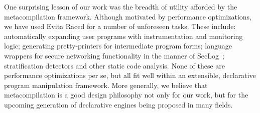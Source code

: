 One surprising lesson of our work was the breadth of utility afforded by the
metacompilation framework.  Although motivated by performance optimizations, we
have used Evita Raced for a number of unforeseen tasks.  These include:
automatically expanding user programs with instrumentation and monitoring
logic; generating pretty-printers for intermediate program forms; language
wrappers for secure networking functionality in the manner of
SecLog~\cite{abadi-netdb07}; stratification detectors and other static code
analysis.  None of these are performance optimizations per se, but all fit well
within an extensible, declarative program manipulation framework.  More
generally, we believe that metacompilation is a good design philosophy not only
for our work, but for the upcoming generation of declarative engines being
proposed in many fields.


